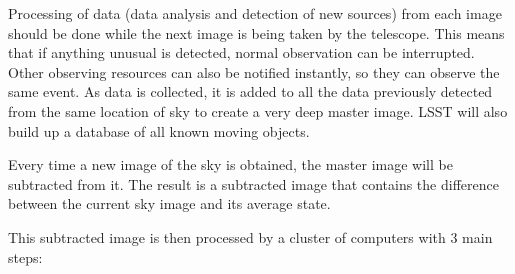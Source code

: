 Processing of data (data analysis and detection of new sources) from each image should be done while the next image is being taken by the telescope.  This means that if anything unusual is detected, normal observation can be interrupted. Other observing resources can also be notified instantly, so they can observe the same event. As data is collected, it is added to all the data previously detected from the same location of sky to create a very deep master image. LSST will also build up a database of all known moving objects.

Every time a new image of the sky is obtained, the master image will be subtracted from it. The result is a subtracted image that contains the difference between the current sky image and its average state.

This subtracted image is then processed by a cluster of computers with 3 main steps:
